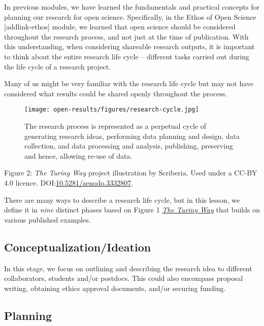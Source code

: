 \documentclass[
  letterpaper,
  DIV=11,
  numbers=noendperiod]{scrreport}
\begin{document}
In previous modules, we have learned the fundamentals and practical
concepts for planning our research for open science. Specifically, in
the Ethos of Open Science {[}addlink-ethos{]} module, we learned that
open science should be considered throughout the research process, and
not just at the time of publication. With this understanding, when
considering shareable research outputs, it is important to think about
the entire research life cycle -- different tasks carried out during the
life cycle of a research project.

Many of us might be very familiar with the research life cycle but may
not have considered what results could be shared openly throughout the
process.

\begin{figure}

{\centering \texttt{[image: open-results/figures/research-cycle.jpg]}

}

\caption{The research process is represented as a perpetual cycle of
generating research ideas, performing data planning and design, data
collection, and data processing and analysis, publishing, preserving and
hence, allowing re-use of data.}

\end{figure}

Figure 2: \emph{The Turing Way} project illustration by Scriberia. Used
under a CC-BY 4.0 licence.
DOI:\href{https://doi.org/10.5281/zenodo.3332807}{10.5281/zenodo.3332807}.

There are many ways to describe a research life cycle, but in this
lesson, we define it in \emph{nine} distinct phases based on Figure 1
\href{https://the-turing-way.netlify.app/reproducible-research/overview.html}{\emph{The
Turing Way}} that builds on various published examples.

\hypertarget{conceptualizationideation}{%
\subsection{Conceptualization/Ideation}\label{conceptualizationideation}}

In this stage, we focus on outlining and describing the research idea to
different collaborators, students and/or postdocs. This could also
encompass proposal writing, obtaining ethics approval documents, and/or
securing funding.

\hypertarget{planning-1}{%
\subsection{Planning}\label{planning-1}}
\end{document}

